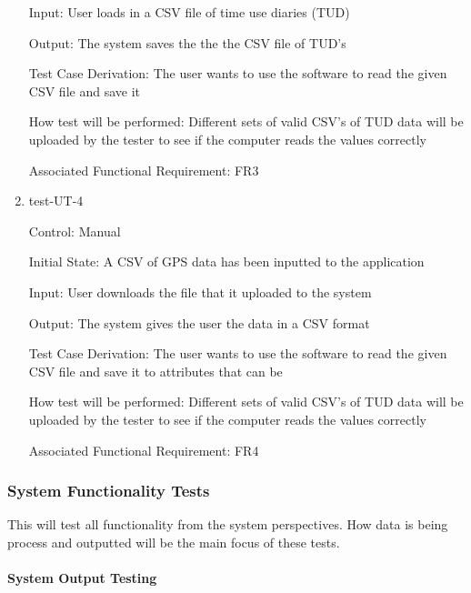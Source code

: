 \documentclass[12pt, titlepage]{article}
\begin{document}
\begin{enumerate}
Input: User loads in a CSV file of time use diaries (TUD)
					
Output: The system saves the the the CSV file of TUD's

Test Case Derivation: The user wants to use the software to read the given CSV file and save it
					
How test will be performed: Different sets of valid CSV's of TUD data will be uploaded by the tester to see if the computer reads the values correctly

Associated Functional Requirement: FR3

\item{test-UT-4\\}

Control: Manual 
					
Initial State: A CSV of GPS data has been inputted to the application
					
Input: User downloads the file that it uploaded to the system 
					
Output: The system gives the user the data in a CSV format 

Test Case Derivation: The user wants to use the software to read the given CSV file and save it to attributes that can be 
					
How test will be performed: Different sets of valid CSV's of TUD data will be uploaded by the tester to see if the computer reads the values correctly

Associated Functional Requirement: FR4
\end{enumerate}

\subsubsection{System Functionality Tests}

This will test all functionality from the system perspectives. How data is being process and outputted will be the main focus of these tests. 
		
\paragraph{System Output Testing}
\end{document}
